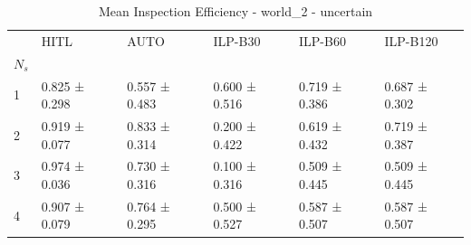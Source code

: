 \begin{table}
\caption{Mean Inspection Efficiency - world_2 - uncertain}
\label{tab:inspection_efficiency_uncertain}
\begin{tabular}{llllll}
\toprule
 & HITL & AUTO & ILP-B30 & ILP-B60 & ILP-B120 \\
$N_s$ &  &  &  &  &  \\
\midrule
1 & 0.825 ± 0.298 & 0.557 ± 0.483 & 0.600 ± 0.516 & 0.719 ± 0.386 & 0.687 ± 0.302 \\
2 & 0.919 ± 0.077 & 0.833 ± 0.314 & 0.200 ± 0.422 & 0.619 ± 0.432 & 0.719 ± 0.387 \\
3 & 0.974 ± 0.036 & 0.730 ± 0.316 & 0.100 ± 0.316 & 0.509 ± 0.445 & 0.509 ± 0.445 \\
4 & 0.907 ± 0.079 & 0.764 ± 0.295 & 0.500 ± 0.527 & 0.587 ± 0.507 & 0.587 ± 0.507 \\
\bottomrule
\end{tabular}
\end{table}
